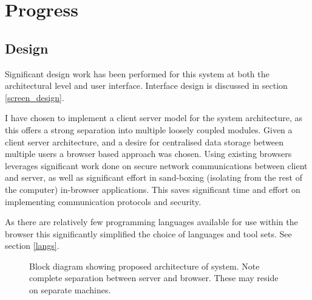 \chapter{Progress}\label{C:progress}

\section{Design}\label{design}

Significant design work has been performed for this system at both the architectural level and user interface. Interface design is discussed in section \ref{screen_design}. 

I have chosen to implement a client server model for the system architecture, as this offers a strong separation into multiple loosely coupled modules. Given a client server architecture, and a desire for centralised data storage between multiple users a browser based approach was chosen. Using existing browsers leverages significant work done on secure network communications between client and server, as well as significant effort in sand-boxing (isolating from the rest of the computer) in-browser applications. This saves significant time and effort on implementing communication protocols and security. 

As there are relatively few programming languages available for use within the browser this significantly simplified the choice of languages and tool sets. See section \ref{langs}.

\begin{figure}[tbh]
\caption{\protect\label{spiral_plan}Block diagram showing proposed architecture of system. Note complete separation between server and browser. These may reside on separate machines.}
\end{figure}

